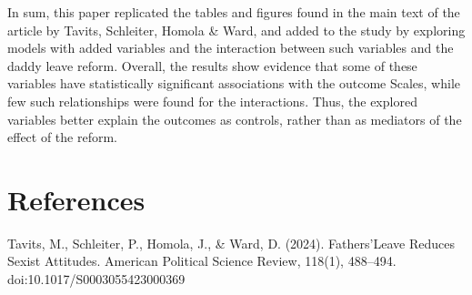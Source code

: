 \documentclass[12pt,letterpaper]{article}
\begin{document}
\noindent In sum, this paper replicated the tables and figures found in the main text of the article by Tavits, Schleiter, Homola \& Ward, and added to the study by exploring models with added variables and the interaction between such variables and the daddy leave reform. Overall, the results show evidence that some of these variables have statistically significant associations with the outcome Scales, while few such relationships were found for the interactions. Thus, the explored variables better explain the outcomes as controls, rather than as mediators of the effect of the reform. 

\vspace{0.5cm}
\section*{References} 

Tavits, M., Schleiter, P., Homola, J., \& Ward, D. (2024). Fathers’Leave Reduces Sexist Attitudes. American Political Science Review, 118(1), 488–494. doi:10.1017/S0003055423000369
\end{document}
